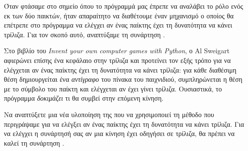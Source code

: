 \documentclass[a4paper,11pt,oneside]{book}
\begin{document}
\begin{exercise}
Όταν φτάσαμε στο σημείο όπου το πρόγραμμά μας έπρεπε να αναλάβει το ρόλο ενός εκ των δύο παικτών, ήταν απαραίτητο να διαθέτουμε έναν μηχανισμό ο οποίος θα επέτρεπε στο πρόγραμμα να ελέγχει αν ένας παίκτης έχει τη δυνατότητα να κάνει τρίλιζα. Για τον σκοπό αυτό, αναπτύξαμε τη συνάρτηση .

Στο βιβλίο του \emph{Invent your own computer games with Python}, ο Al Sweigart αφιερώνει επίσης ένα κεφάλαιο στην τρίλιζα και προτείνει τον εξής τρόπο για να ελέγχεται αν ένας παίκτης έχει τη δυνατότητα να κάνει τρίλιζα: για κάθε διαθέσιμη θέση δημιουργείται ένα%
\emph{αντίγραφο} του πίνακα του παιχνιδιού, συμπληρώνεται η θέση με το σύμβολο του παίκτη και ελέγχεται αν έχει γίνει τρίλιζα. Ουσιαστικά, το πρόγραμμα \emph{δοκιμάζει} τι θα συμβεί στην επόμενη κίνηση.

Να αναπτύξετε μια νέα υλοποίηση της  που να χρησιμοποιεί τη μέθοδο που περιγράψαμε για να ελέγξει αν ένας παίκτης έχει τη δυνατότητα να κάνει τρίλιζα. Για να ελέγχει η συνάρτησή σας αν μια κίνηση έχει οδηγήσει σε τρίλιζα, θα πρέπει να καλεί τη συνάρτηση .
\end{exercise}
\end{document}
